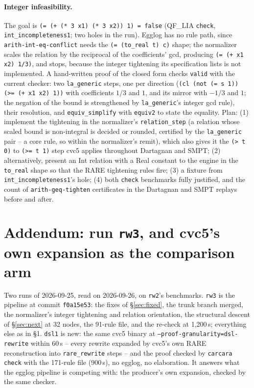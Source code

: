 \documentclass[11pt,a4paper]{article}
\newcommand{\LIA}{QF\_LIA}
\newcommand{\code}[1]{\texttt{#1}}
\begin{document}
\paragraph{Integer infeasibility.} The goal is
\code{(= (+ (* 3 x1) (* 3 x2)) 1) = false} (\LIA{} \code{check},
\code{int\_incompleteness1}; two holes in the run).
Egglog has no rule path, since \code{arith-int-eq-conflict} needs the
\code{(= (to\_real t) c)} shape; the normalizer scales the relation by the
reciprocal of the coefficients' gcd, producing \code{(= (+ x1 x2) 1/3)},
and stops, because the integer tightening its specification lists is not
implemented. A hand-written proof of the closed form checks \code{valid}
with the current checker: two \code{la\_generic} steps, one per direction
(\code{(cl (not (= s 1)) (>= (+ x1 x2) 1))} with coefficients $1/3$ and
$1$, and its mirror with $-1/3$ and $1$; the negation of the bound is
strengthened by \code{la\_generic}'s integer gcd rule), their resolution,
and \code{equiv\_simplify} with \code{equiv2} to state the equality. Plan:
(1) implement the tightening in the normalizer's \code{relation\_step}
(a relation whose scaled bound is non-integral is decided or rounded,
certified by the \code{la\_generic} pair -- a core rule, so within the
normalizer's remit), which also gives it the \code{(> t 0)} to
\code{(>= t 1)} step cvc5 applies throughout Dartagnan and SMPT; (2)
alternatively, present an Int relation with a Real constant to the engine
in the \code{to\_real} shape so that the RARE tightening rules fire; (3) a
fixture from \code{int\_incompleteness1}'s hole; (4) both \code{check}
benchmarks fully justified, and the count of \code{arith-geq-tighten}
certificates in the Dartagnan and SMPT replays before and after.

\clearpage
\section{Addendum: run \code{rw3}, and cvc5's own expansion as the comparison arm}\label{sec:rw3}

Two runs of 2026-09-25, read on 2026-09-26, on \code{rw2}'s benchmarks.
\code{rw3} is the pipeline at commit \code{f0a15e53}: the fixes of
\S\ref{sec:fixed}, the trunk branch merged, the normalizer's integer
tightening and relation orientation, the structural descent of
\S\ref{sec:next} at 32 nodes, the 91-rule file, and the re-check at
1,200\,s; everything else as in \S1. \code{dsl1} is new: the same cvc5
binary at \code{--proof-granularity=dsl-rewrite} within 60\,s -- every
rewrite expanded by cvc5's own RARE reconstruction into
\code{rare\_rewrite} steps -- and the proof checked by \code{carcara check}
with the 171-rule file (900\,s), no egglog, no elaboration. It answers what
the egglog pipeline is competing with: the producer's own expansion, checked
by the same checker.
\end{document}
